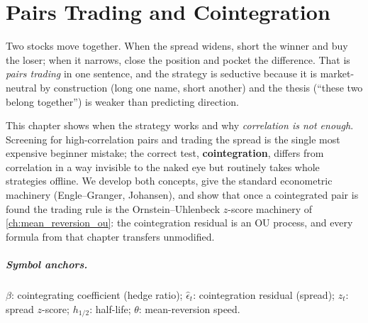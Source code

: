 \chapter{Pairs Trading and Cointegration}
\label{ch:pairs_cointegration}

Two stocks move together. When the spread widens, short the winner
and buy the loser; when it narrows, close the position and pocket
the difference. That is \emph{pairs trading} in one sentence, and
the strategy is seductive because it is market-neutral by
construction (long one name, short another) and the thesis
(``these two belong together'') is weaker than predicting
direction.

This chapter shows when the strategy works and why
\emph{correlation is not enough}. Screening for high-correlation
pairs and trading the spread is the single most expensive beginner
mistake; the correct test, \textbf{cointegration}, differs from
correlation in a way invisible to the naked eye but routinely
takes whole strategies offline. We develop both concepts, give the
standard econometric machinery (Engle--Granger, Johansen), and
show that once a cointegrated pair is found the trading rule is
the Ornstein--Uhlenbeck $z$-score machinery of
\cref{ch:mean_reversion_ou}: the cointegration residual is an OU
process, and every formula from that chapter transfers unmodified.

\paragraph{Symbol anchors.} $\beta$: cointegrating coefficient
(hedge ratio); $\hat\epsilon_t$: cointegration residual (spread);
$z_t$: spread $z$-score; $h_{1/2}$: half-life; $\theta$:
mean-reversion speed.

